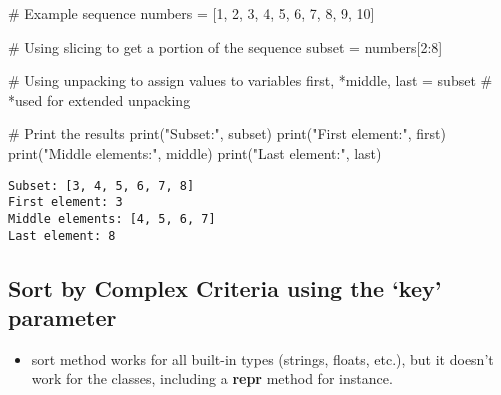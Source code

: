 \documentclass[
]{report}
\newenvironment{Shaded}{\begin{snugshade}}{\end{snugshade}}
\newcommand{\BuiltInTok}[1]{\textcolor[rgb]{0.00,0.23,0.31}{#1}}
\newcommand{\CommentTok}[1]{\textcolor[rgb]{0.37,0.37,0.37}{#1}}
\newcommand{\DecValTok}[1]{\textcolor[rgb]{0.68,0.00,0.00}{#1}}
\newcommand{\NormalTok}[1]{\textcolor[rgb]{0.00,0.23,0.31}{#1}}
\newcommand{\OperatorTok}[1]{\textcolor[rgb]{0.37,0.37,0.37}{#1}}
\newcommand{\StringTok}[1]{\textcolor[rgb]{0.13,0.47,0.30}{#1}}
\providecommand{\tightlist}{%
  \setlength{\itemsep}{0pt}\setlength{\parskip}{0pt}}\usepackage{longtable,booktabs,array}
\begin{document}
\begin{Shaded}
\begin{Highlighting}[]
\CommentTok{\# Example sequence}
\NormalTok{numbers }\OperatorTok{=}\NormalTok{ [}\DecValTok{1}\NormalTok{, }\DecValTok{2}\NormalTok{, }\DecValTok{3}\NormalTok{, }\DecValTok{4}\NormalTok{, }\DecValTok{5}\NormalTok{, }\DecValTok{6}\NormalTok{, }\DecValTok{7}\NormalTok{, }\DecValTok{8}\NormalTok{, }\DecValTok{9}\NormalTok{, }\DecValTok{10}\NormalTok{]}

\CommentTok{\# Using slicing to get a portion of the sequence}
\NormalTok{subset }\OperatorTok{=}\NormalTok{ numbers[}\DecValTok{2}\NormalTok{:}\DecValTok{8}\NormalTok{]}

\CommentTok{\# Using unpacking to assign values to variables}
\NormalTok{first, }\OperatorTok{*}\NormalTok{middle, last }\OperatorTok{=}\NormalTok{ subset   }\CommentTok{\# *used for extended unpacking}

\CommentTok{\# Print the results}
\BuiltInTok{print}\NormalTok{(}\StringTok{"Subset:"}\NormalTok{, subset)}
\BuiltInTok{print}\NormalTok{(}\StringTok{"First element:"}\NormalTok{, first)}
\BuiltInTok{print}\NormalTok{(}\StringTok{"Middle elements:"}\NormalTok{, middle)}
\BuiltInTok{print}\NormalTok{(}\StringTok{"Last element:"}\NormalTok{, last)}
\end{Highlighting}
\end{Shaded}

\begin{verbatim}
Subset: [3, 4, 5, 6, 7, 8]
First element: 3
Middle elements: [4, 5, 6, 7]
Last element: 8
\end{verbatim}

\hypertarget{sort-by-complex-criteria-using-the-key-parameter}{%
\subsection{Sort by Complex Criteria using the `key'
parameter}\label{sort-by-complex-criteria-using-the-key-parameter}}

\begin{itemize}
\tightlist
\item
  sort method works for all built-in types (strings, floats, etc.), but
  it doesn't work for the classes, including a \textbf{repr} method for
  instance.
\end{itemize}
\end{document}

